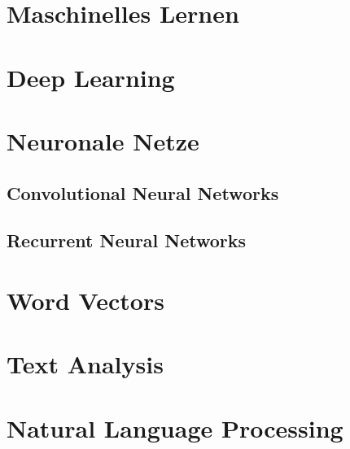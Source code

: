 \section{Maschinelles Lernen}


\section{Deep Learning}


\section{Neuronale Netze}
\subsection{Convolutional Neural Networks}

\subsection{Recurrent Neural Networks}


\section{Word Vectors}


\section{Text Analysis}


\section{Natural Language Processing}
